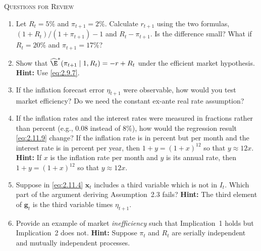 \bigskip
\noindent\textsc{Questions for Review}
\begin{enumerate}
\item Let $R_t = 5\%$ and $\pi_{t+1} = 2\%$. Calculate $r_{t+1}$ using the two formulas,
$(1 + R_t)/(1 + \pi_{t+1}) - 1$ and $R_t - \pi_{t+1}$. Is the difference small? What if
$R_t = 20\%$ and $\pi_{t+1} = 17\%$?

\item Show that $\widehat{\E}^*(\pi_{t+1} \mid 1, R_t) = -r + R_t$ under the efficient market
hypothesis. \textbf{Hint:} Use \eqref{eq:2.9.7}.

\item If the inflation forecast error $\eta_{t+1}$ were observable, how would you test market
efficiency? Do we need the constant ex-ante real rate assumption?

\item If the inflation rates and the interest rates were measured in fractions rather
than percent (e.g., 0.08 instead of 8\%), how would the regression result \eqref{eq:2.11.9}
change? If the inflation rate is in percent but per month and the interest rate is
in percent per year, then $1 + y = (1 + x)^{12}$ so that $y \approx 12x$.
\textbf{Hint:} If $x$ is the inflation rate per month and $y$ is its annual
rate, then $1 + y = (1 + x)^{12}$ so that $y \approx 12x$.

\item Suppose in \eqref{eq:2.11.4} $\mathbf{x}_t$ includes a third variable which is not in $I_t$. Which part
of the argument deriving Assumption~2.3 fails? \textbf{Hint:} The third element of
$\mathbf{g}_t$ is the third variable times $\eta_{t+1}$.

\item Provide an example of market \emph{inefficiency} such that Implication~1 holds but
Implication~2 does not. \textbf{Hint:} Suppose $\pi_t$ and $R_t$ are serially independent and
mutually independent processes.
\end{enumerate}
